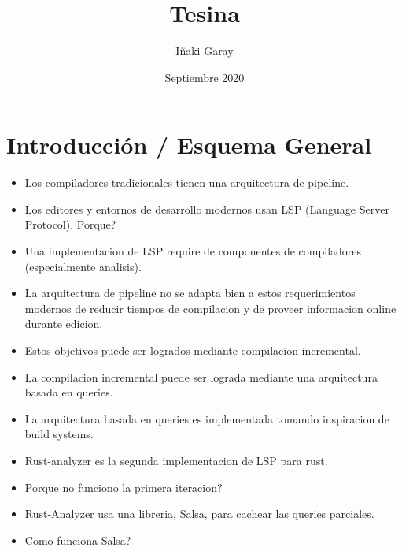 \documentclass[12pt, a4paper]{report}
\title{Tesina}
\author{Iñaki Garay}
\date{Septiembre 2020}
\begin{document}
\begin{titlepage}
\maketitle
\thispagestyle{empty}
\end{titlepage}

\tableofcontents
\thispagestyle{empty}

\newpage

\chapter*{Introducción / Esquema General}

\begin{itemize}[noitemsep]

\item Los compiladores tradicionales tienen una arquitectura de pipeline.

\item Los editores y entornos de desarrollo modernos usan LSP (Language Server
Protocol). Porque?

\item Una implementacion de LSP require de componentes de compiladores
(especialmente analisis).

\item La arquitectura de pipeline no se adapta bien a estos requerimientos
modernos de reducir tiempos de compilacion y de proveer informacion online
durante edicion.

\item Estos objetivos puede ser logrados mediante compilacion incremental.

\item La compilacion incremental puede ser lograda mediante una arquitectura
basada en queries.

\item La arquitectura basada en queries es implementada tomando inspiracion de
build systems.

\item Rust-analyzer es la segunda implementacion de LSP para rust.

\item Porque no funciono la primera iteracion?

\item Rust-Analyzer usa una libreria, Salsa, para cachear las queries parciales.

\item Como funciona Salsa?

\end{itemize}
\end{document}
